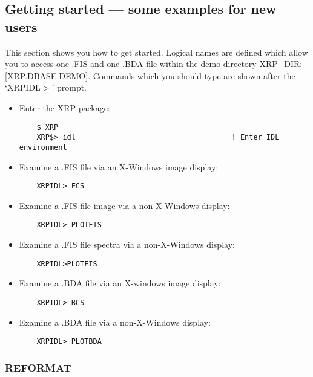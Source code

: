 \subsection{Getting started --- some examples for new users}

This section shows you how to get started.
Logical names are defined which allow you to access one .FIS and one .BDA file
within the demo directory XRP\_DIR:[XRP.DBASE.DEMO].
Commands which you should type are shown after the `XRPIDL$>$' prompt.
\begin{itemize}
\item Enter the XRP package:
\begin{verbatim}
    $ XRP
    XRP$> idl                                    ! Enter IDL environment
\end{verbatim}
\item Examine a .FIS file via an X-Windows image display:
\begin{verbatim}
    XRPIDL> FCS
\end{verbatim}
\item Examine a .FIS file image via a non-X-Windows display:
\begin{verbatim}
    XRPIDL> PLOTFIS
\end{verbatim}
\item Examine a .FIS file spectra via a non-X-Windows display:
\begin{verbatim}
    XRPIDL>PLOTFIS
\end{verbatim}
\item Examine a .BDA file via an X-windows image display:
\begin{verbatim}
    XRPIDL> BCS
\end{verbatim}
\item Examine a .BDA file via a non-X-Windows display:
\begin{verbatim}
    XRPIDL> PLOTBDA
\end{verbatim}
\end{itemize}

\subsubsection{REFORMAT}


